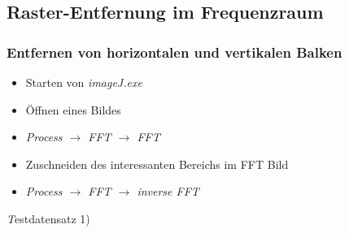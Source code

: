 \documentclass[12pt,german]{article}
\begin{document}
\newpage
\subsection{Raster-Entfernung im Frequenzraum}
\subsubsection{Entfernen von horizontalen und vertikalen Balken}
\begin{itemize}
	\item Starten von \textit{imageJ.exe}
	\item Öffnen eines Bildes
	\item \textit{Process $\rightarrow$ FFT $\rightarrow$ FFT}
	\item Zuschneiden des interessanten Bereichs im FFT Bild
	\item \textit{Process $\rightarrow$ FFT $\rightarrow$ inverse FFT}
\end{itemize}

\textit Testdatensatz 1)
\end{document}
